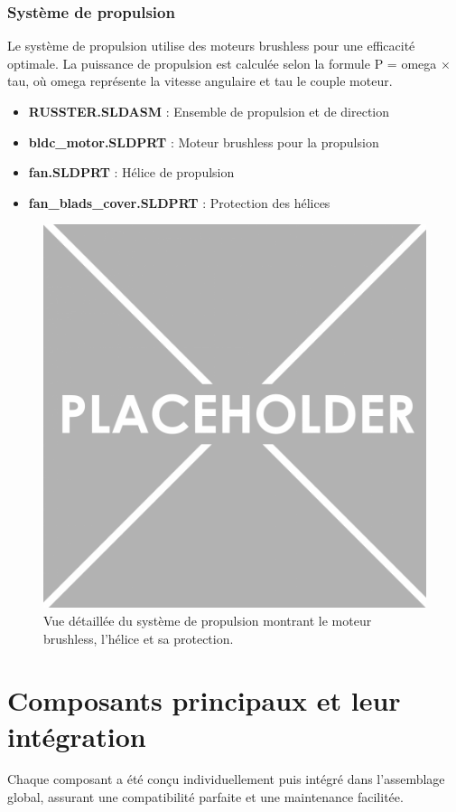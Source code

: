 {\subsubsection{Système de propulsion}
Le système de propulsion utilise des moteurs brushless pour une efficacité optimale. La puissance de propulsion est calculée selon la formule P = \gls{omega} × \gls{tau}, où \gls{omega} représente la vitesse angulaire et \gls{tau} le couple moteur.

\begin{itemize}
    \setlength{\itemsep}{.375em}
    \item \textbf{RUSSTER.SLDASM} : Ensemble de propulsion et de direction
    \item \textbf{bldc\_motor.SLDPRT} : Moteur brushless pour la propulsion
    \item \textbf{fan.SLDPRT} : Hélice de propulsion
    \item \textbf{fan\_blads\_cover.SLDPRT} : Protection des hélices
\end{itemize}

\begin{figure}[!htpb]
    \centering
    \includegraphics[width=0.7\linewidth]{Figures/PezizaTuberosa.jpg}
    \caption[Système de propulsion]{Vue détaillée du système de propulsion montrant le moteur brushless, l'hélice et sa protection.}
    \label{fig:propulsion-system}
\end{figure}

\section{Composants principaux et leur intégration}
Chaque composant a été conçu individuellement puis intégré dans l'assemblage global, assurant une compatibilité parfaite et une maintenance facilitée.

}
